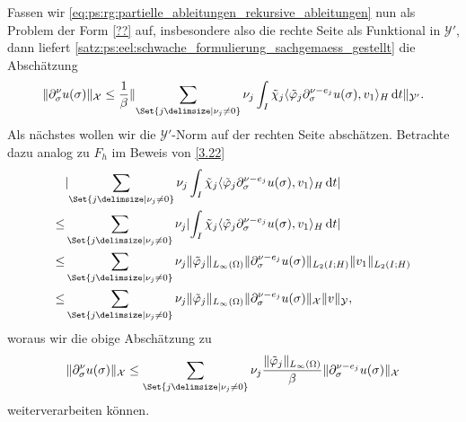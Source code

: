 \begin{Satz}
\begin{Beweis}
        Fassen wir \cref{eq:ps:rg:partielle_ableitungen_rekursive_ableitungen} nun als Problem der Form \cref{??} auf, insbesondere also die rechte Seite als Funktional in $\mathcal Y'$, dann liefert \cref{satz:ps:eel:schwache_formulierung_sachgemaess_gestellt} die Abschätzung
        \begin{equation}
            \norm{\partial^{\nu}_{\sigma} u(\sigma)}_{\mathcal X} \leq \frac{1}{\beta} \norm{\sum_{\Set{j \given \nu_{j} \neq 0}} \nu_{j} \int_{I} \tilde{\chi}_{j} \skp{\tilde{\varphi}_{j} \partial^{\nu - e_{j}}_{\sigma} u(\sigma)}{v_{1}}{H} \diff t}_{\mathcal Y'}.
        \end{equation}
        Als nächstes wollen wir die $\mathcal Y'$-Norm auf der rechten Seite abschätzen.
        Betrachte dazu analog zu $F_{h}$ im Beweis von \cref{3.22}
        \begin{align}
            &\abs{\sum_{\Set{j \given \nu_{j} \neq 0}} \nu_{j} \int_{I} \tilde{\chi}_{j} \skp{\tilde{\varphi}_{j} \partial^{\nu - e_{j}}_{\sigma} u(\sigma)}{v_{1}}{H} \diff t}
            \\\leq
            &\sum_{\Set{j \given \nu_{j} \neq 0}} \nu_{j} \abs {\int_{I} \tilde{\chi}_{j} \skp{\tilde{\varphi}_{j} \partial^{\nu - e_{j}}_{\sigma} u(\sigma)}{v_{1}}{H} \diff t}
            \\\leq
            &\sum_{\Set{j \given \nu_{j} \neq 0}} \nu_{j} \norm{\tilde{\varphi}_{j}}_{L_{\infty}(\Omega)} \norm{\partial^{\nu - e_{j}}_{\sigma} u(\sigma)}_{L_{2}(I; H)} \norm{v_{1}}_{L_{2}(I; H)}
            \\\leq
            &\sum_{\Set{j \given \nu_{j} \neq 0}} \nu_{j} \norm{\tilde{\varphi}_{j}}_{L_{\infty}(\Omega)} \norm{\partial^{\nu - e_{j}}_{\sigma} u(\sigma)}_{\mathcal X} \norm{v}_{\mathcal Y},
        \end{align}
        woraus wir die obige Abschätzung zu
        \begin{equation}
            \norm{\partial^{\nu}_{\sigma} u(\sigma)}_{\mathcal X} \leq \sum_{\Set{j \given \nu_{j} \neq 0}} \nu_{j} \frac{\norm{\tilde{\varphi}_{j}}_{L_{\infty}(\Omega)}}{\beta} \norm{\partial^{\nu - e_{j}}_{\sigma} u(\sigma)}_{\mathcal X}
        \end{equation}
        weiterverarbeiten können.


\end{Beweis}
\end{Satz}
